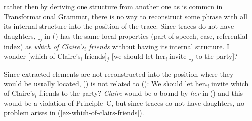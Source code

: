 \documentclass[output=paper
 	        ,biblatex
                ,babelshorthands
                ,newtxmath
                ,draftmode
                ,colorlinks, citecolor=brown
]{langscibook}
\begin{document}
rather then by deriving one structure from another one as is common in Transformational Grammar,
there is no way to reconstruct some phrase with all its internal structure into the position of the
trace. Since traces do not have daughters, $\__j$ in () has the same local properties (part
of speech, case, referential index) as \emph{which of Claire's$_i$ friends} without having its
internal structure. 
\ea
\label{ex-which-of-clairs-friends}
I wonder [which of Claire's$_i$ friends]$_j$ [we should let her$_i$ invite $\__j$ to the party]?
\z
{}

Since extracted elements are not reconstructed into the position where they would be usually
located, () is not related to ():
\ea
We should let her$_{*i}$ invite which of Claire's$_i$ friends to the party?
\z
\emph{Claire} would be o-bound by \emph{her} in () and this would be a violation of
Principle~C, but since traces do not have daughters, no problem arises in (\ref{ex-which-of-clairs-friends}). 
\end{document}
